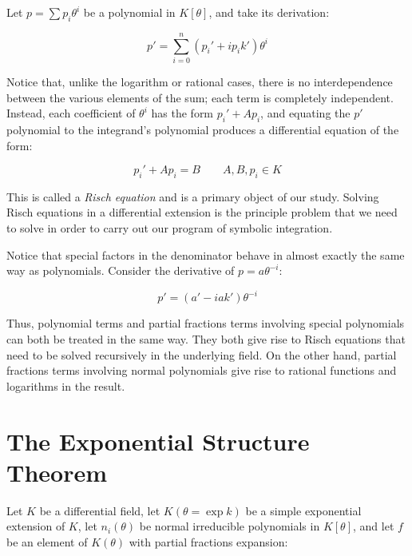 \begin{comment}

t=tan x
t^2+1 = tan^2 x + 1 = sec^2 x
d(t^2+1) = 2tdt = 2 tan x sec^2 x

dt/dx = sec^2 x = (1 + tan^2 x)
Dt = t^2 + 1
D(t^2+1) = 2t(t^2+1)

\end{comment}

Let $p=\sum p_i \theta^i$ be a polynomial in $K[\theta]$,
and take its derivation:

$$p' = \sum_{i=0}^n (p_i' + i p_i k') \theta^i$$

Notice that, unlike the logarithm or rational cases, there is no
interdependence between the various elements of the sum; each term is
completely independent.  Instead, each coefficient of $\theta^i$ has
the form $p_i' + A p_i$, and equating the $p'$ polynomial to the
integrand's polynomial produces a differential equation of the form:

$$p_i' + A p_i = B \qquad A,B,p_i \in K$$

This is called a {\it Risch equation} and is a primary object of our
study.  Solving Risch equations in a differential extension is the
principle problem that we need to solve in order to carry out our
program of symbolic integration.

Notice that special factors in the denominator behave in almost
exactly the same way as polynomials.  Consider the derivative of
$p=a \theta^{-i}$:

$$p' = (a' - i a k') \theta^{-i}$$

Thus, polynomial terms and partial fractions terms involving special
polynomials can both be treated in the same way.  They both give rise
to Risch equations that need to be solved recursively in the underlying
field.  On the other hand, partial fractions terms involving
normal polynomials give rise to rational functions and logarithms
in the result.

\vfill\eject
\section{The Exponential Structure Theorem}

\theorem\label{exponential structure theorem}
Let $K$ be a differential field, let $K(\theta = \exp k)$ be a simple
exponential extension of $K$, let $n_i(\theta)$ be
normal irreducible polynomials in $K[\theta]$,
and let $f$ be an element of $K(\theta)$
with partial fractions expansion:

